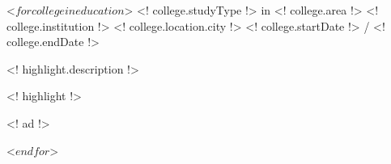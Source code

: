 \begin{cventries}
 <$ for college in education $>
  \cventry
    {<! college.studyType !> in <! college.area !>}
    {<! college.institution !>}
    {<! college.location.city !>}
    {<! college.startDate !> / <! college.endDate !>}
    {
          \begin{cvitems}
                    \item{<! highlight.description !>}
                    \item{<! highlight !>}
                    \begin{cvitemssub}
                        \item{<! ad !>}
                    \end{cvitemssub}
          \end{cvitems}
    }
 <$ endfor $>
\end{cventries}
